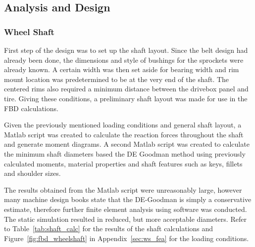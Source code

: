 \subsection{Analysis and Design}
\subsubsection{Wheel Shaft}
First step of the design was to set up the shaft layout. Since the belt design had already been done, the dimensions and style of bushings for the sprockets were already known. A certain width was then set aside for bearing width and rim mount location was predetermined to be at the very end of the shaft. The centered rims also required a minimum distance between the drivebox panel and tire. Giving these conditions, a preliminary shaft layout was made for use in the FBD calculations.

Given the previously mentioned loading conditions and general shaft layout, a Matlab script was created to calculate the reaction forces throughout the shaft and generate moment diagrams. A second Matlab script was created to calculate the minimum shaft diameters based the DE Goodman method using previously calculated moments, material properties and shaft features such as keys, fillets and shoulder sizes.

The results obtained from the Matlab script were unreasonably large, however many machine design books state that the DE-Goodman is simply a conservative estimate, therefore further finite element analysis using software was conducted. The static simulation resulted in reduced, but more acceptable diameters. Refer to Table~\ref{tab:shaft_calc} for the results of the shaft calculations and Figure~\ref{fig:fbd_wheelshaft} in Appendix~\ref{sec:ws_fea} for the loading conditions.

